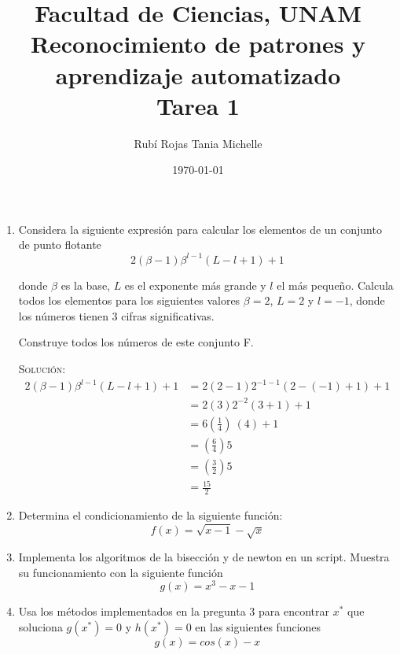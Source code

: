 \documentclass[letterpaper,11pt]{article}
\title{Facultad de Ciencias, UNAM \\ 
       Reconocimiento de patrones y aprendizaje automatizado \\ 
       Tarea 1}
\author{Rubí Rojas Tania Michelle}
\date{\today}
\begin{document}
\maketitle

\begin{enumerate}
    \item Considera la siguiente expresión para calcular los elementos de un 
    conjunto de punto flotante 
    \begin{equation*}
        2(\beta - 1) \beta^{l-1} (L - l + 1) + 1
    \end{equation*}

    donde $\beta$ es la base, $L$ es el exponente más grande y $l$ el más 
    pequeño. Calcula todos los elementos para los siguientes valores 
    $\beta = 2$, $L = 2$ y $l = -1$, donde los números tienen $3$ cifras 
    significativas.

    Construye todos los números de este conjunto F.

    \textsc{Solución:}
    \begin{align*}
        2(\beta - 1) \beta^{l-1} (L - l + 1) + 1
        &= 2(2 - 1) 2^{-1-1} (2 - (-1) + 1) + 1 \\
        &= 2(3) 2^{-2} (3 + 1) + 1 \\ 
        &= 6 \left( \frac{1}{4} \right)\ (4) + 1 \\ 
        &= \left( \frac{6}{4} \right) 5 \\ 
        &= \left( \frac{3}{2} \right) 5 \\
        &= \frac{15}{2}
    \end{align*}
    
    \item Determina el condicionamiento de la siguiente función:
    \begin{equation*}
        f(x) = \sqrt{x - 1} - \sqrt{x}
    \end{equation*}

    \item Implementa los algoritmos de la bisección y de newton en un 
    script. Muestra su funcionamiento con la siguiente función 
    \begin{equation*}
        g(x) = x^3 - x - 1
    \end{equation*}

    \item Usa los métodos implementados en la pregunta $3$ para encontrar $x^*$
    que soluciona $g(x^*) = 0$ y $h(x^*) = 0$ en las siguientes funciones
    \begin{equation*}
        g(x) = cos(x) - x
    \end{equation*}


\end{enumerate}
\end{document}
